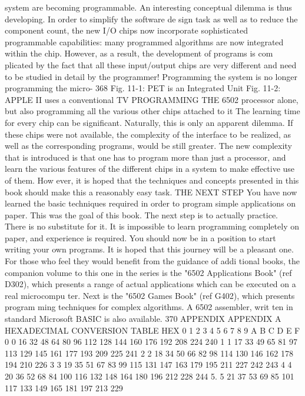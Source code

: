 {{{{{{{{{{{{{{{{{{{{{{{{{{{{{{{{{{{{{{{{{{{{{{{{{{{{{{{{{{{{{{{{{{{{{{{{{{{{{{{{{{{{{{{{{{{{{{{{{{{{{{{{{{{{{{{{{{{{{{{{{{{{{{{{{{{{{{{{{{{{system are becoming programmable. An interesting conceptual
dilemma is thus developing. In order to simplify the software de
sign task as well as to reduce the component count, the new I/O
chips now incorporate sophisticated programmable capabilities:
many programmed algorithms are now integrated within the
chip. However, as a result, the development of programs is com
plicated by the fact that all these input/output chips are very
different and need to be studied in detail by the programmer!
Programming the system is no longer programming the micro-
368
Fig. 11-1: PET is an Integrated Unit
Fig. 11-2: APPLE II uses a conventional TV
PROGRAMMING THE 6502
processor alone, but also programming all the various other chips
attached to it The learning time for every chip can be significant.
Naturally, this is only an apparent dilemma. If these chips were
not available, the complexity of the interface to be realized, as
well as the corresponding programs, would be still greater. The
new complexity that is introduced is that one has to program
more than just a processor, and learn the various features of the
different chips in a system to make effective use of them. How
ever, it is hoped that the techniques and concepts presented in
this book should make this a reasonably easy task.
THE NEXT STEP
You have now learned the basic techniques required in order to
program simple applications on paper. This was the goal of this
book. The next step is to actually practice. There is no substitute
for it. It is impossible to learn programming completely on paper,
and experience is required. You should now be in a position to
start writing your own programs. It is hoped that this journey
will be a pleasant one.
For those who feel they would benefit from the guidance of addi
tional books, the companion volume to this one in the series is the
"6502 Applications Book" (ref D302), which presents a range of
actual applications which can be executed on a real microcompu
ter. Next is the "6502 Games Book" (ref G402), which presents program
ming techniques for complex algorithms. A 6502 assembler, writ
ten in standard Microsoft BASIC is also available.
370
APPENDIX
APPENDIX A
HEXADECIMAL CONVERSION TABLE
HEX
0
1
2
3
4
5
6
7
8
9
A
B
C
D
E
F
0
0
16
32
48
64
80
96
112
128
144
160
176
192
208
224
240
1
1
17
33
49
65
81
97
113
129
145
161
177
193
209
225
241
2
2
18
34
50
66
82
98
114
130
146
162
178
194
210
226
3
3
19
35
51
67
83
99
115
131
147
163
179
195
211
227
242 243
4
4
20
36
52
68
84
100
116
132
148
164
180
196
212
228
244
5.
5
21
37
53
69
85
101
117
133
149
165
181
197
213
229
}}}}}}}}}}}}}}}}}}}}}}}}}}}}}}}}}}}}}}}}}}}}}}}}}}}}}}}}}}}}}}}}}}}}}}}}}}}}}}}}}}}}}}}}}}}}}}}}}}}}}}}}}}}}}}}}}}}}}}}}}}}}}}}}}}}}}}}}}}}}
